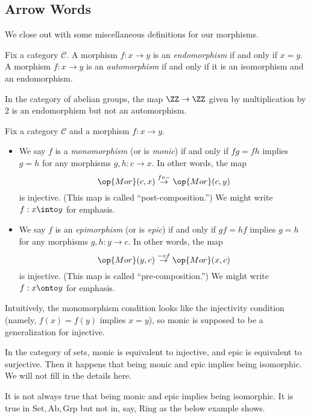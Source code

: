 \subsection{Arrow Words}
We close out with some miscellaneous definitions for our morphisms.
\begin{definition}
	Fix a category $\mathcal C$. A morphism $f:x\to y$ is an \textit{endomorphism} if and only if $x=y$. A morphism $f:x\to y$ is an \textit{automorphism} if and only if it is an isomorphism and an endomorphism.
\end{definition}
\begin{example}
	In the category of abelian groups, the map $\ZZ\to\ZZ$ given by multiplication by $2$ is an endomorphism but not an automorphism.
\end{example}
\begin{definition}
	Fix a category $\mathcal C$ and a morphism $f:x\to y$.
	\begin{itemize}
		\item We say $f$ is a \textit{monomorphism} (or is \textit{monic}) if and only if $fg=fh$ implies $g=h$ for any morphisms $g,h:c\to x$. In other words, the map
		\[\op{Mor}(c,x)\stackrel{f\circ-}\to\op{Mor}(c,y)\]
		is injective. (This map is called ``post-composition.'') We might write $f:x\into y$ for emphasis.
		\item We say $f$ is an \textit{epimorphism} (or is \textit{epic}) if and only if $gf=hf$ implies $g=h$ for any morphisms $g,h:y\to c$. In other words, the map
		\[\op{Mor}(y,c)\stackrel{-\circ f}\to\op{Mor}(x,c)\]
		is injective. (This map is called ``pre-composition.'') We might write $f:x\onto y$ for emphasis.
	\end{itemize}
\end{definition}
Intuitively, the monomorphism condition looks like the injectivity condition (namely, $f(x)=f(y)$ implies $x=y$), so monic is supposed to be a generalization for injective.
\begin{example}
	In the category of sets, monic is equivalent to injective, and epic is equivalent to surjective. Then it happens that being monic and epic implies being isomorphic. We will not fill in the details here.
\end{example}
\begin{warn}
	It is not always true that being monic and epic implies being isomorphic. It is true in $\mathrm{Set},\mathrm{Ab},\mathrm{Grp}$ but not in, say, $\mathrm{Ring}$ as the below example shows.
\end{warn}
